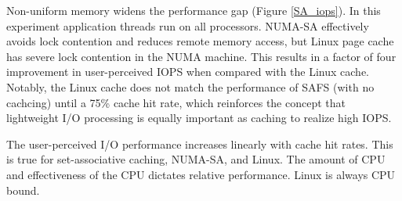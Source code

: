 Non-uniform memory widens the performance gap (Figure \ref{SA_iops}).
In this experiment application threads run on all processors.
NUMA-SA effectively avoids lock contention and reduces remote memory access,
but Linux page cache has severe lock contention in the NUMA machine.
This results in a factor of four improvement in user-perceived
IOPS when compared with the Linux cache.  Notably, the Linux cache does not match the 
performance of SAFS (with no cachcing) until a 75\% 
cache hit rate, which reinforces the concept that lightweight I/O processing is 
equally important as caching to realize high IOPS.

The user-perceived I/O performance increases linearly with cache hit rates.
This is true for set-associative caching, NUMA-SA, and Linux.
The amount of CPU and effectiveness of the CPU dictates relative performance.
Linux is always CPU bound.

